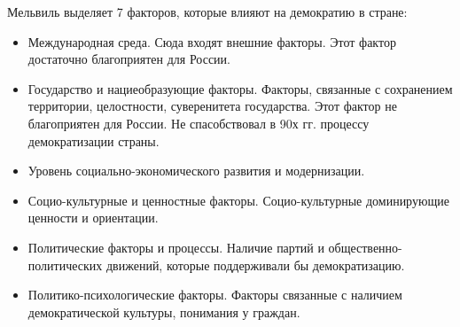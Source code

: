 Мельвиль выделяет 7 факторов, которые влияют на демократию в стране:
\begin{itemize}
	\item Международная среда. Сюда входят внешние факторы. Этот фактор достаточно благоприятен для России.
	\item Государство и нациеобразующие факторы. Факторы, связанные с сохранением территории, целостности, суверенитета государства. Этот фактор не благоприятен для России. Не спасобствовал в 90х гг. процессу демократизации страны.
	\item Уровень социально-экономического развития и модернизации.
	\item Социо-культурные и ценностные факторы. Социо-культурные доминирующие ценности и ориентации.
	\item Политические факторы и процессы. Наличие партий и общественно-политических движений, которые поддерживали бы демократизацию.
	\item Политико-психологические факторы. Факторы связанные с наличием демократической культуры, понимания у граждан.
\end{itemize}